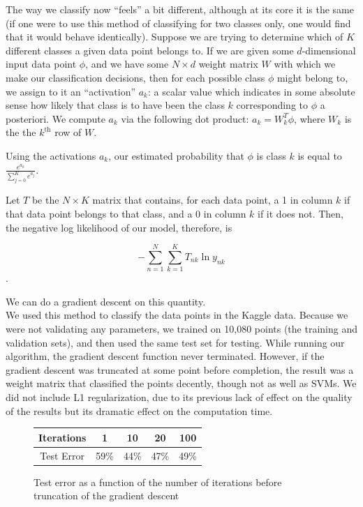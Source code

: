 \documentclass{sigchi}
\begin{document}
The way we classify now ``feels'' a bit different, although at its core it is the same (if one were to use this method of classifying for two classes only, one would find that it would behave identically). Suppose we are trying to determine which of $K$ different classes a given data point belongs to. If we are given some $d$-dimensional input data point $\phi$, and we have some $N \times d$ weight matrix $W$ with which we make our classification decisions, then for each possible class $\phi$ might belong to, we assign to it an ``activation'' $a_k$: a scalar value which indicates in some absolute sense how likely that class is to have been the class $k$ corresponding to $\phi$ a posteriori. We compute $a_k$ via the following dot product: $a_k = W_k^T\phi$, where $W_k$ is the the $k^{\textrm{th}}$ row of $W$. 

Using the activations $a_k$, our estimated probability that $\phi$ is class $k$ is equal to $\frac{e^{a_k}}{\sum_{j=0}^K e^{a_j}}$. 

Let $T$ be the $N \times K$ matrix that contains, for each data point, a 1 in column $k$ if that data point belongs to that class, and a 0 in column $k$ if it does not. Then, the negative log likelihood of our model, therefore, is 

$$-\sum_{n=1}^N \sum_{k=1}^K T_{nk} \ln y_{nk}$$.

We can do a gradient descent on this quantity. \\

We used this method to classify the data points in the Kaggle data. Because we were not validating any parameters, we trained on 10,080 points (the training and validation sets), and then used the same test set for testing. While running our algorithm, the gradient descent function never terminated. However, if the gradient descent was truncated at some point before completion, the result was a weight matrix that classified the points decently, though not as well as SVMs. We did not include L1 regularization, due to its previous lack of effect on the quality of the results but its dramatic effect on the computation time.

\renewcommand*{\arraystretch}{1.5}
\begin{figure}
\centering
	\begin{tabular}{| c | c | c | c | c |}
	\hline
	Iterations & 1 & 10 & 20 & 100 \\
	\hline
	Test Error & 59\% & 44\% & 47\% & 49\% \\
	\hline
	\end{tabular}
	\caption{Test error as a function of the number of iterations before truncation of the gradient descent}
\end{figure}
\end{document}
